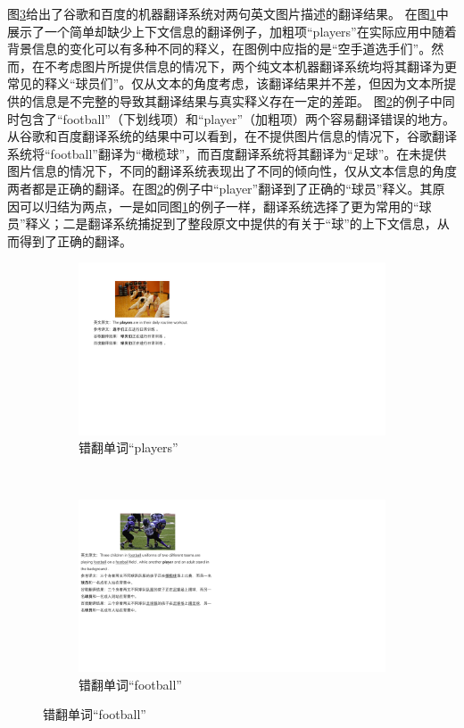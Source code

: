 图\ref{fig:1_translation_cases}给出了谷歌和百度的机器翻译系统对两句英文图片描述的翻译结果。
在图\ref{fig:1_players}中展示了一个简单却缺少上下文信息的翻译例子，加粗项“players”在实际应用中随着背景信息的变化可以有多种不同的释义，在图例中应指的是“空手道选手们”。然而，在不考虑图片所提供信息的情况下，两个纯文本机器翻译系统均将其翻译为更常见的释义“球员们”。仅从文本的角度考虑，该翻译结果并不差，但因为文本所提供的信息是不完整的导致其翻译结果与真实释义存在一定的差距。
图\ref{fig:1_football}的例子中同时包含了“football”（下划线项）和“player”（加粗项）两个容易翻译错误的地方。从谷歌和百度翻译系统的结果中可以看到，在不提供图片信息的情况下，谷歌翻译系统将“football”翻译为“橄榄球”，而百度翻译系统将其翻译为“足球”。在未提供图片信息的情况下，不同的翻译系统表现出了不同的倾向性，仅从文本信息的角度两者都是正确的翻译。在图\ref{fig:1_football}的例子中“player”翻译到了正确的“球员”释义。其原因可以归结为两点，一是如同图\ref{fig:1_players}的例子一样，翻译系统选择了更为常用的“球员”释义；二是翻译系统捕捉到了整段原文中提供的有关于“球”的上下文信息，从而得到了正确的翻译。
\begin{figure}[!htbp]
    \centering
    \begin{subfigure}[b]{1\linewidth}
      \centering
      \includegraphics{Img/fig_1_case_players.pdf}
      \caption{错翻单词“players”}
      \label{fig:1_players}
    \end{subfigure}%
    \\
    \begin{subfigure}[b]{\linewidth}
      \centering
      \includegraphics{Img/fig_1_case_football.pdf}
      \caption{错翻单词“football”}
      \label{fig:1_football}
    \end{subfigure}
    \label{fig:1_translation_cases}
\end{figure}

